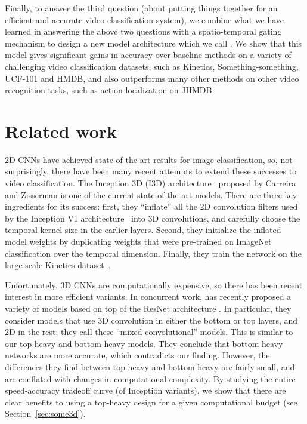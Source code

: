 \documentclass[runningheads]{llncs}
\newcommand{\Something}{Something-something}
\begin{document}
Finally, to answer the third question (about putting things together for an efficient and accurate video classification system), we combine what we have learned in answering
the above two questions with a spatio-temporal gating mechanism
to design a new model architecture
which we call \SG.
We show that this model gives significant gains in accuracy over baseline methods on  a variety of challenging video classification datasets, such as Kinetics,
\Something, UCF-101 and HMDB,
and also outperforms many other methods on other video recognition tasks, such as action localization on JHMDB.




 \section{Related work}
\label{sec:related}

2D CNNs have achieved state of the art results for image classification,
so, not surprisingly, 
 there have been many recent attempts to extend these successes
to video classification.
 The Inception 3D (I3D) architecture~\cite{carreira2017quo} proposed by Carreira and Zisserman is one of the current
 state-of-the-art models. There are three key ingredients for its success: first, they ``inflate'' all the 2D convolution filters used by the Inception V1 architecture~\cite{InceptionV1} into 3D convolutions, and carefully choose the temporal kernel size in the earlier layers. Second, they initialize the inflated model weights by duplicating weights
 that were pre-trained on ImageNet classification
 over the temporal dimension. Finally, they train the network on
  the large-scale Kinetics dataset~\cite{kay2017kinetics}.

  

Unfortunately, 3D CNNs are computationally expensive, so there has been recent interest in more efficient variants.
In concurrent work, \cite{Tran2018}
has recently proposed a variety of models based on top
of the ResNet architecture \cite{resnet}.
In particular, they consider models that use 3D convolution in either the bottom or top layers, and 2D in the rest; they call these ``mixed convolutional'' models.
This is similar to our top-heavy and bottom-heavy models.
They conclude that bottom heavy networks are more accurate,
which contradicts our finding.
However, the differences they find between top heavy and bottom heavy are fairly small,
and are conflated with changes in computational complexity.
By studying the entire speed-accuracy tradeoff curve (of Inception variants),
we show that there are clear benefits to using a top-heavy design for a given computational budget (see Section~\ref{sec:some3d}).
\end{document}
